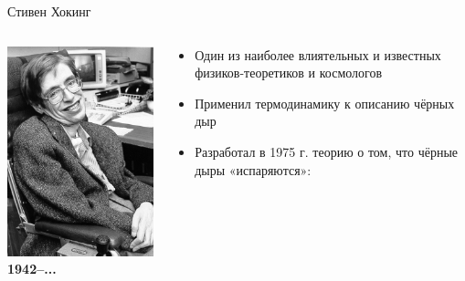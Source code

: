 \documentclass[usenames,dvipsnames,pdftex,unicode,hidelinks]{beamer}
\begin{document}
  \begin{frame}{Стивен Хокинг}
    \begin{columns}[t]
      \begin{column}{0.25\textwidth}
        \begin{center}
          \includegraphics[width=\textwidth]{hawking}\\
          \textbf{1942--...}
        \end{center}
      \end{column}
      \begin{column}{0.75\textwidth}
        \begin{itemize}
          \item Один из наиболее влиятельных и известных физиков-теоретиков и космологов
          \item Применил термодинамику к описанию чёрных дыр
          \item Разработал в 1975 г. теорию о том, что чёрные дыры «испаряются»:

\end{itemize}
\end{column}
\end{columns}
\end{frame}
\end{document}
